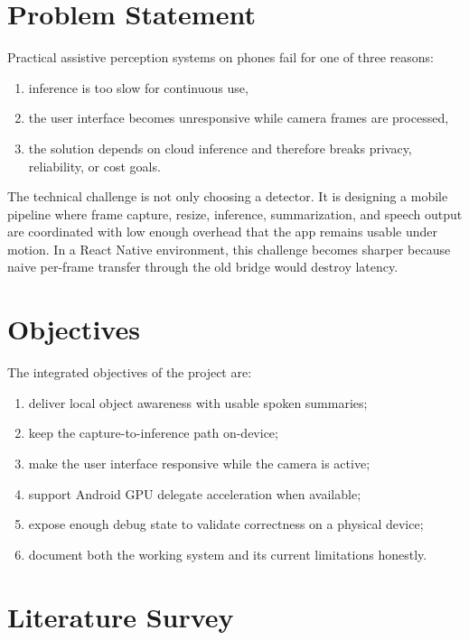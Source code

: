 \documentclass[conference]{IEEEtran}
\begin{document}
\section{Problem Statement}
Practical assistive perception systems on phones fail for one of three reasons:
\begin{enumerate}[leftmargin=1.2em]
\item inference is too slow for continuous use,
\item the user interface becomes unresponsive while camera frames are processed,
\item the solution depends on cloud inference and therefore breaks privacy, reliability, or cost goals.
\end{enumerate}

The technical challenge is not only choosing a detector. It is designing a mobile pipeline where frame capture, resize, inference, summarization, and speech output are coordinated with low enough overhead that the app remains usable under motion. In a React Native environment, this challenge becomes sharper because naive per-frame transfer through the old bridge would destroy latency.

\section{Objectives}
The integrated objectives of the project are:
\begin{enumerate}[leftmargin=1.2em]
\item deliver local object awareness with usable spoken summaries;
\item keep the capture-to-inference path on-device;
\item make the user interface responsive while the camera is active;
\item support Android GPU delegate acceleration when available;
\item expose enough debug state to validate correctness on a physical device;
\item document both the working system and its current limitations honestly.
\end{enumerate}

\section{Literature Survey}
\end{document}
